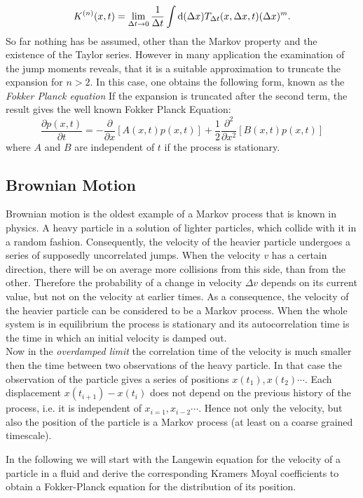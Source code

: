 \begin{equation}
    K^{(n)}(x,t) = \lim_{\Delta t \rightarrow 0} \frac{1}{\Delta t} \int {\rm d}(\Delta x) T_{\Delta t}(x,\Delta x,t) (\Delta x)^m .
    \label{jump moments}
\end{equation}
So far nothing has be assumed, other than the Markov property and the existence of the Taylor series. However in many application the examination of the jump moments reveals, that it is a suitable approximation to truncate the expansion for $n>2$. In this case, one obtains the following form, known as the \textit{Fokker Planck equation}   
If the expansion is truncated after the second term, the result gives the well known Fokker Planck Equation:
\begin{equation}
    \frac{\partial p(x,t)}{\partial t} = - \frac{\partial}{\partial x} \left[A(x,t)p(x,t) \right] + \frac{1}{2}\frac{\partial^2}{\partial x^2}\left[ B(x,t)p(x,t) \right] 
    \label{FPE}
\end{equation}
where $A$ and $B$ are independent of $t$ if the process is stationary. \\
\subsection{Brownian Motion}
Brownian motion is the oldest example of a Markov process that is known in physics. A heavy particle in a solution of lighter particles, which collide with it in a random fashion. Consequently, the velocity of the heavier particle undergoes a series of supposedly uncorrelated jumps. When the velocity $v$ has a certain direction, there will be on average more collisions from this side, than from the other. Therefore the probability of a change in velocity $\Delta v$ depends on its current value, but not on the velocity at earlier times. As a consequence, the velocity of the heavier particle can be considered to be a Markov process. When the whole system is in equilibrium the process is stationary and its autocorrelation time is the time in which an initial velocity is damped out. \\
Now in the \textit{overdamped limit} the correlation time of the velocity is much smaller then the time between two observations of the heavy particle. In that case the observation of the particle gives a series of positions $x(t_1), x(t_2) \cdots$. Each displacement $x(t_{i+1}) - x(t_{i})$ does not depend on the previous history of the process, i.e. it is independent of $x_{i=1}, x_{i-2}\cdots$. Hence not only the velocity, but also the position of the particle is a Markov process (at least on a coarse grained timescale). 
\par
In the following we will start with the Langewin equation for the velocity of a particle in a fluid and derive the corresponding Kramers Moyal coefficients to obtain a Fokker-Planck equation for the distribution of its position. 

